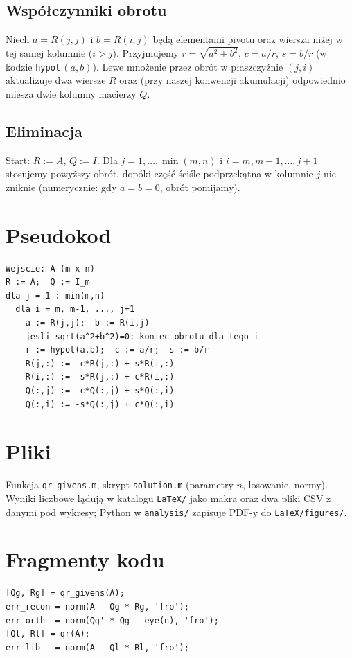 \documentclass[polish]{template/projectreport}
\begin{document}
\subsection{Współczynniki obrotu}
Niech $a=R(j,j)$ i $b=R(i,j)$ będą elementami pivotu oraz wiersza niżej w tej samej kolumnie ($i>j$). Przyjmujemy
$r=\sqrt{a^2+b^2}$, $c=a/r$, $s=b/r$ (w kodzie \texttt{hypot}\,$(a,b)$). Lewe mnożenie przez obrót w płaszczyźnie
$(j,i)$ aktualizuje dwa wiersze $R$ oraz (przy naszej konwencji akumulacji) odpowiednio miesza dwie kolumny macierzy $Q$.

\subsection{Eliminacja}
Start: $R:=A$, $Q:=I$. Dla $j=1,\ldots,\min(m,n)$ i $i=m,m-1,\ldots,j+1$ stosujemy powyższy obrót, dopóki część
ściśle podprzekątna w kolumnie $j$ nie zniknie (numerycznie: gdy $a=b=0$, obrót pomijamy).

\section{Pseudokod}
\begin{verbatim}
Wejscie: A (m x n)
R := A;  Q := I_m
dla j = 1 : min(m,n)
  dla i = m, m-1, ..., j+1
    a := R(j,j);  b := R(i,j)
    jesli sqrt(a^2+b^2)=0: koniec obrotu dla tego i
    r := hypot(a,b);  c := a/r;  s := b/r
    R(j,:) :=  c*R(j,:) + s*R(i,:)
    R(i,:) := -s*R(j,:) + c*R(i,:)
    Q(:,j) :=  c*Q(:,j) + s*Q(:,i)
    Q(:,i) := -s*Q(:,j) + c*Q(:,i)
\end{verbatim}

\section{Pliki}
Funkcja \texttt{qr\_givens.m}, skrypt \texttt{solution.m} (parametry $n$, losowanie, normy). Wyniki liczbowe lądują
w katalogu \texttt{LaTeX/} jako makra oraz dwa pliki CSV z danymi pod wykresy; Python w \texttt{analysis/} zapisuje
PDF-y do \texttt{LaTeX/figures/}.

\section{Fragmenty kodu}


\begin{lstlisting}[caption={solution.m (fragment)}]
[Qg, Rg] = qr_givens(A);
err_recon = norm(A - Qg * Rg, 'fro');
err_orth  = norm(Qg' * Qg - eye(n), 'fro');
[Ql, Rl] = qr(A);
err_lib   = norm(A - Ql * Rl, 'fro');
\end{lstlisting}
\end{document}

